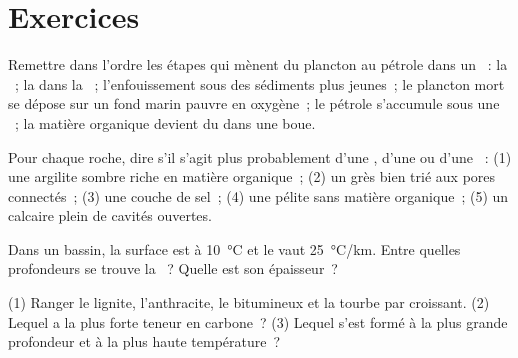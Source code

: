 \section{Exercices}

\begin{exercise}[$\star$]\label{exo:g11:fossil-fuel-geology:1}
Remettre dans l'ordre les étapes qui mènent du plancton au pétrole dans un
~: la ~; la  dans la ~;
l'enfouissement sous des sédiments plus jeunes~; le plancton mort se dépose
sur un fond marin pauvre en oxygène~; le pétrole s'accumule sous une
~; la matière organique devient du  dans une boue.
\end{exercise}

\begin{exercise}[$\star$]\label{exo:g11:fossil-fuel-geology:2}
Pour chaque roche, dire s'il s'agit plus probablement d'une ,
d'une  ou d'une ~: (1) une argilite sombre riche en
matière organique~; (2) un grès bien trié aux pores connectés~; (3) une
couche de sel~; (4) une pélite sans matière organique~; (5) un calcaire
plein de cavités ouvertes.
\end{exercise}

\begin{exercise}[$\star$]\label{exo:g11:fossil-fuel-geology:3}
Dans un bassin, la surface est à \qty{10}{\degreeCelsius} et le  vaut \qty{25}{\degreeCelsius/km}. Entre quelles profondeurs se
trouve la ~? Quelle est son épaisseur~?
\end{exercise}

\begin{exercise}[$\star$]\label{exo:g11:fossil-fuel-geology:4}
(1) Ranger le lignite, l'anthracite, le  bitumineux et la tourbe par
 croissant. (2) Lequel a la plus forte teneur en carbone~? (3) Lequel
s'est formé à la plus grande profondeur et à la plus haute température~?
\end{exercise}

